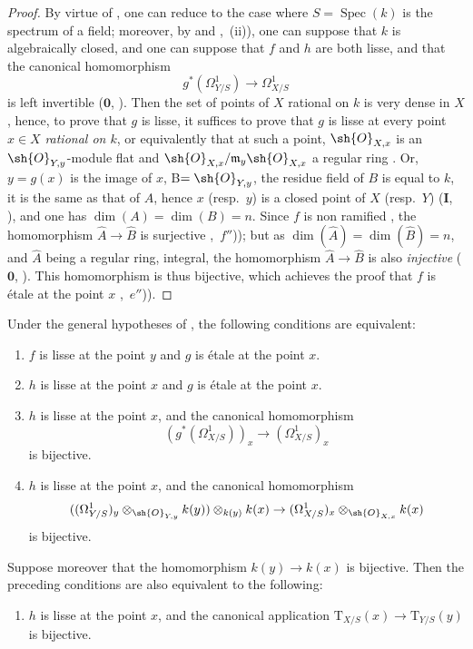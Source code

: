 \begin{proof}
By virtue of , one can reduce to the case where $S=\operatorname{Spec}(k)$ is the spectrum of a field; moreover, by  and ,~(ii)), one can suppose that $k$ is algebraically closed, and one can suppose that $f$ and $h$ are both lisse, and that the canonical homomorphism
\[
g^*(\Omega^1_{Y/S}) \to \Omega^1_{X/S}
\]
is left invertible ($\mathbf{0}$, ).
Then the set of points of $X$ rational on $k$ is very dense in $X$ , hence, to prove that $g$ is lisse, it suffices to prove that $g$ is lisse at every point $x\in X$ \emph{rational on $k$}, or equivalently that at such a point, $\sh{O}_{X,x}$ is an $\sh{O}_{Y,y}$-module flat and $\sh{O}_{X,x}/\mathfrak{m}_y\sh{O}_{X,x}$ a regular ring .
Or, $y=g(x)$ is the image of $x$, B$=\sh{O}_{Y,y}$, the residue field of $B$ is equal to $k$, it is the same as that of $A$, hence $x$ (resp.\ $y$) is a closed point of $X$ (resp.\ $Y$) ($\mathbf{I}$, ), and one has $\dim(A)=\dim(B)=n$.
Since $f$ is non ramified , the homomorphism $\hat{A}\to\hat{B}$ is surjective ,~$f''$)); but as $\dim(\hat{A})=\dim(\hat{B})=n$, and $\hat{A}$ being a regular ring, integral, the homomorphism $\hat{A}\to\hat{B}$ is also \emph{injective} ($\mathbf{0}$, ).
This homomorphism is thus bijective, which achieves the proof that $f$ is \'etale at the point $x$ ,~$e''$)).
\end{proof}


\begin{corollary}[17.11.2]
\label{IV.17.11.2}
Under the general hypotheses of , the following conditions are equivalent:
\begin{enumerate}
  \item[a)] $f$ is lisse at the point $y$ and $g$ is \'etale at the point $x$.
  \item[b)] $h$ is lisse at the point $x$ and $g$ is \'etale at the point $x$.
  \item[c)] $h$ is lisse at the point $x$, and the canonical homomorphism
\[
(g^*(\Omega^1_{X/S}))_x \to (\Omega^1_{X/S})_x
\]
is bijective.
  \item[c')] $h$ is lisse at the point $x$, and the canonical homomorphism
\[
((\Omega^1_{Y/S})_y\otimes_{\sh{O}_{Y,y}} k(y))\otimes_{k(y)} k(x) \to (\Omega^1_{X/S})_x\otimes_{\sh{O}_{X,x}} k(x)
\]
is bijective.
\end{enumerate}
Suppose moreover that the homomorphism $k(y)\to k(x)$ is bijective.
Then the preceding conditions are also equivalent to the following:
\begin{enumerate}
  \item[d)] $h$ is lisse at the point $x$, and the canonical application $\mathrm{T}_{X/S}(x)\to\mathrm{T}_{Y/S}(y)$  is bijective.
\end{enumerate}
\end{corollary}

